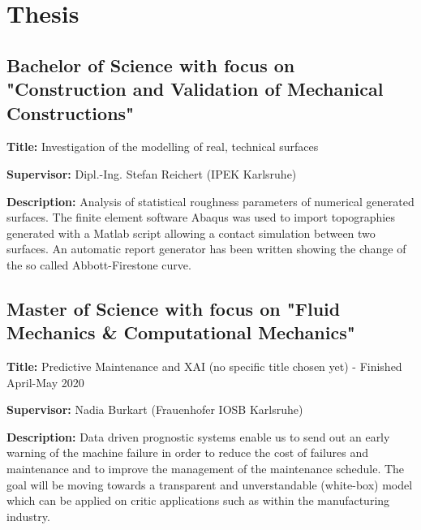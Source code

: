 \documentclass[11pt,a4paper,sans]{moderncv}        %
\begin{document}
\vspace{2pt}



\section{Thesis}
\vspace{3pt}

\subsection{Bachelor of Science with focus on "Construction and Validation of Mechanical Constructions"}

\vspace{3pt}

\textbf{Title:} Investigation of the modelling of real, technical surfaces \newline

\textbf{Supervisor:} Dipl.-Ing. Stefan Reichert (IPEK Karlsruhe) \newline

\textbf{Description:} Analysis of statistical roughness parameters of numerical generated surfaces. The finite element software Abaqus was used to import topographies generated with a Matlab script allowing a contact simulation between two surfaces. An automatic report generator has been written showing the change of the so called Abbott-Firestone curve.

\vspace{6pt}

\subsection{Master of Science with focus on "Fluid Mechanics \& Computational Mechanics"}

\vspace{3pt}

\textbf{Title:} Predictive Maintenance and XAI (no specific title chosen yet) - Finished April-May 2020 \newline

\textbf{Supervisor:} Nadia Burkart (Frauenhofer IOSB Karlsruhe) \newline

\textbf{Description:} Data driven prognostic systems enable us to send out an early warning of the machine failure in order to reduce the cost of failures and maintenance and to improve the management of the maintenance schedule. The goal will be moving towards a transparent and unverstandable (white-box) model which can be applied on critic applications such as within the manufacturing industry.
\end{document}
